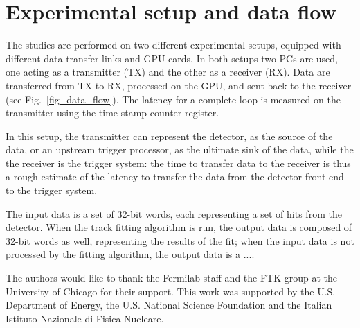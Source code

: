 \documentclass[letterpaper]{jpconf}
\begin{document}
\section{Experimental setup and data flow}
The studies are performed on two different experimental setups,
equipped with different data transfer links and GPU cards.  In both
setups two PCs are used, one acting as a transmitter (TX) and the
other as a receiver (RX).  Data are transferred from TX to RX,
processed on the GPU, and sent back to the receiver (see
Fig.~\ref{fig_data_flow}).  The latency for a complete loop is
measured on the transmitter using the time stamp counter register.

In this setup, the transmitter can represent the detector, as
the source of the data, or an upstream trigger processor, as
the ultimate sink of the data, while the the receiver is the
trigger system: the time to transfer data to the receiver is thus a
rough estimate of the latency to transfer the data from the detector
front-end to the trigger system.
 
The input data is a set of 32-bit words, each representing a set of
hits from the detector. When the track fitting algorithm is run, the
output data is composed of 32-bit words as well, representing the
results of the fit; when the input data is not processed by the
fitting algorithm, the output data is a .... 


\ack
The authors would like to thank the Fermilab staff and the FTK group at the 
University of Chicago for their support. This work was supported by the
U.S. Department of Energy, the U.S. National Science Foundation and the Italian
Istituto Nazionale di Fisica Nucleare. 






 
\end{document}
